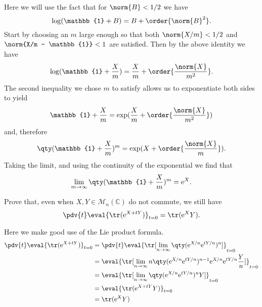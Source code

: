 \documentclass[pages,boxes,color=WildStrawberry]{homework}
\newcommand{\C}{\mathbb{C}}
\newcommand{\1}{\mathbb{1}}
\newcommand{\e}{\mathrm{e}}
\newcommand{\mats}[2]{\mathcal{M}_{#1}(#2)}
\begin{document}
\begin{solution}
	Here we will use the fact that for $\norm{B} < 1/2$ we have
	\begin{equation*}
		\log(\1 + B) = B + \order{\norm{B}^2}.
	\end{equation*}
	Start by choosing an $m$ large enough so that both $\norm{X/m} < 1/2$ and $\norm{X/m - \1} < 1$ are satisfied. Then by the above identity we have
	\begin{equation*}
		\log(\1 + \frac{X}{m}) = \frac{X}{m} + \order{\frac{\norm{X}}{m^2}}.
	\end{equation*}
	The second inequality we chose $m$ to satisfy allows us to exponentiate both sides to yield
	\begin{equation*}
		\1 + \frac{X}{m} = \exp(\frac{X}{m} + \order{\frac{\norm{X}}{m^2}})
	\end{equation*}
	and, therefore
	\begin{equation*}
		\qty(\1 + \frac{X}{m})^m = \exp(X + \order{\frac{\norm{X}}{m}}).
	\end{equation*}
	Taking the limit, and using the continuity of the exponential we find that
	\begin{equation*}
		\lim_{m\to\infty}\qty(\1 + \frac{X}{m})^m = \e^X.
	\end{equation*}
\end{solution}

\begin{problem}
Prove that, even when $X, Y\in\mats{n}{\C}$ do not commute, we still have \[\pdv{t}\eval{\tr(\e^{X + tY})}_{t=0} = \tr(\e^XY).\]
\end{problem}

\begin{solution}
	Here we make good use of the Lie product formula.
	\begin{align*}
		\pdv{t}\eval{\tr(\e^{X + tY})}_{t=0} & = \pdv{t}\eval{\tr[\lim_{n\to\infty}\qty(\e^{X/n}\e^{tY/n})^n]}_{t=0}                           \\
		                                     & = \eval{\tr[\lim_{n\to\infty}n\qty(\e^{X/n}\e^{tY/n})^{n-1}\e^{X/n}\e^{tY/n}\frac{Y}{n}]}_{t=0} \\
		                                     & = \eval{\tr[\lim_{n\to\infty}\qty(\e^{X/n}\e^{tY/n})^nY]}_{t=0}                                 \\
		                                     & = \eval{\tr(\e^{X+tY}Y)}_{t=0}                                                                  \\
		                                     & = \tr(\e^{X}Y)                                                                                  \\
	\end{align*}
\end{solution}
\end{document}

